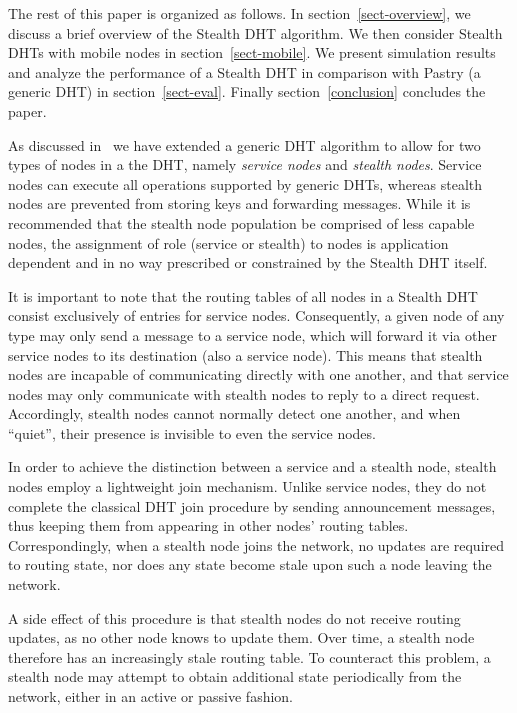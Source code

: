 \documentclass[times, 10pt,twocolumn]{article}
\begin{document}
The rest of this paper is organized as follows. In
section~\ref{sect-overview}, we discuss a brief overview of the
Stealth DHT algorithm. We then consider Stealth DHTs with mobile
nodes in section~\ref{sect-mobile}. We present simulation results
and analyze the performance of a Stealth DHT in comparison with
Pastry (a generic DHT) in section~\ref{sect-eval}.
Finally section~\ref{conclusion} concludes the paper.

 \label{sect-overview}

As discussed in~\cite{stealth1} we have extended a generic DHT
algorithm to allow for two types of nodes in a the DHT, namely {\em
service nodes} and {\em stealth nodes}. Service nodes can execute
all operations supported by generic DHTs, whereas stealth nodes are
prevented from storing keys and forwarding messages. While it is
recommended that the stealth node population be comprised of less
capable nodes, the assignment of role (service or stealth) to nodes
is application dependent and in no way prescribed or constrained by
the Stealth DHT itself.

It is important to note that the routing tables of all nodes in a
Stealth DHT consist exclusively of entries for service nodes.
Consequently, a given node of any type may only send a message to a
service node, which will forward it via other service nodes to its
destination (also a service node). This means that stealth nodes are
incapable of communicating directly with one another, and that
service nodes may only communicate with stealth nodes to reply to a
direct request. Accordingly, stealth nodes cannot normally detect
one another, and when ``quiet'', their presence is invisible to even
the service nodes.

In order to achieve the distinction between a service and a stealth
node, stealth nodes employ a lightweight join mechanism. Unlike
service nodes, they do not complete the classical DHT join procedure
by sending announcement messages, thus keeping them from appearing
in other nodes' routing tables. Correspondingly, when a stealth node
joins the network, no updates are required to routing state, nor
does any state become stale upon such a node leaving the network.

A side effect of this procedure is that stealth nodes do not receive
routing updates, as no other node knows to update them. Over time, a
stealth node therefore has an increasingly stale routing table. To
counteract this problem, a stealth node may attempt to obtain
additional state periodically from the network, either in an active
or passive fashion.
\end{document}

